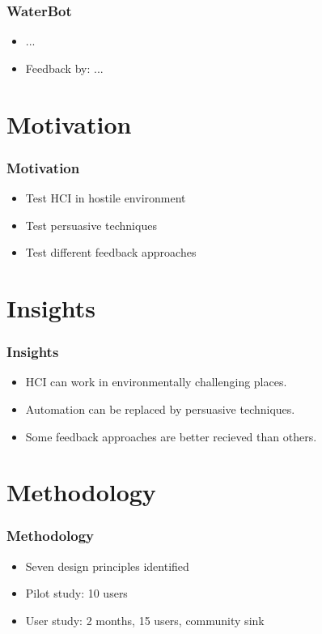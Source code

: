 \documentclass{beamer}
\begin{document}
\begin{frame}
	\frametitle{WaterBot}
	\begin{itemize}
	  \item ...
          \item Feedback by: ...
        \end{itemize}          

\end{frame}








\section{Motivation}
\begin{frame}
	\frametitle{Motivation}
	\begin{itemize}
	  \item Test HCI in hostile environment
	  \item Test persuasive techniques
          \item Test different feedback approaches
        \end{itemize}          

\end{frame}

\section{Insights}
\begin{frame}
	\frametitle{Insights}
	\begin{itemize}
	  \item HCI can work in environmentally challenging places.
          \item Automation can be replaced by persuasive techniques.
          \item Some feedback approaches are better recieved than others.
        \end{itemize}          

\end{frame}
\section{Methodology}
\begin{frame}
	\frametitle{Methodology}
	\begin{itemize}
	  \item Seven design principles identified
	  \item Pilot study: 10 users
          \item User study: 2 months, 15 users, community sink
        \end{itemize}          

\end{frame}
\end{document}
